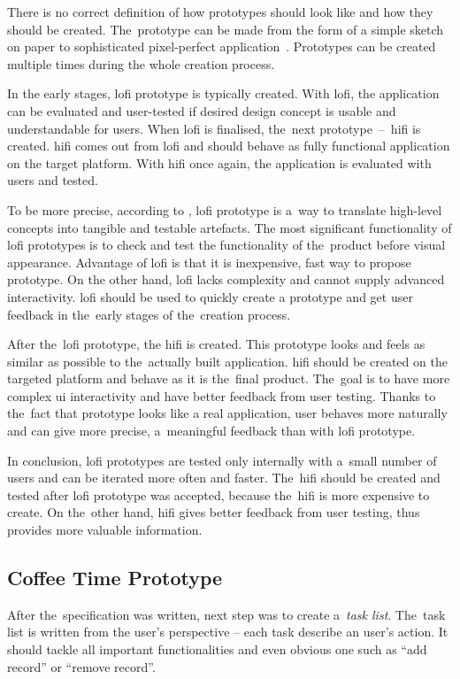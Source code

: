 There is no correct definition of how prototypes should look like and how they should be created. The~prototype can be made from the form of a simple sketch on paper to sophisticated pixel-perfect application~\cite{adobe-prototype}. Prototypes can be created multiple times during the whole creation process. 

In the early stages, \gls{lofi} prototype is typically created. With \gls{lofi}, the application can be evaluated and user-tested if desired design concept is usable and understandable for users. When \gls{lofi} is finalised, the~next prototype~--~\gls{hifi} is created. \gls{hifi} comes out from \gls{lofi} and should behave as fully functional application on the target platform. With \gls{hifi} once again, the application is evaluated with users and tested. 

To be more precise, according to \cite{adobe-prototype}, \gls{lofi} prototype is a~way to translate high-level concepts into tangible and testable artefacts. The most significant  functionality of \gls{lofi} prototypes is to check and test the functionality of the~product before visual appearance. Advantage of \gls{lofi} is that it is inexpensive, fast way to propose prototype. On the other hand, \gls{lofi} lacks complexity and cannot supply advanced interactivity. \gls{lofi} should be used to quickly create a prototype and get user feedback in the~early stages of the~creation process. 

After the~\gls{lofi} prototype, the \gls{hifi} is created. This prototype looks and feels as similar as possible to the~actually built application. \gls{hifi} should be created on the targeted platform and behave as it is the~final product. The~goal is to have more complex \gls{ui} interactivity and have better feedback from user testing. Thanks to the~fact that prototype looks like a real application, user behaves more naturally and can give more precise, a~meaningful feedback than with \gls{lofi} prototype. 

In conclusion, \gls{lofi} prototypes are tested only internally with a~small number of users and can be iterated more often and faster. The~\gls{hifi} should be created and tested after \gls{lofi} prototype was accepted, because the~\gls{hifi} is more expensive to create. On the~other hand, \gls{hifi} gives better feedback from user testing, thus provides more valuable information.
\subsection{Coffee Time Prototype}
After the~specification was written, next step was to create a~\textit{task list}. The~task list is written from the user's perspective -- each task describe an user's action. It should tackle all important functionalities and even obvious one such as ``add record'' or ``remove record''.

